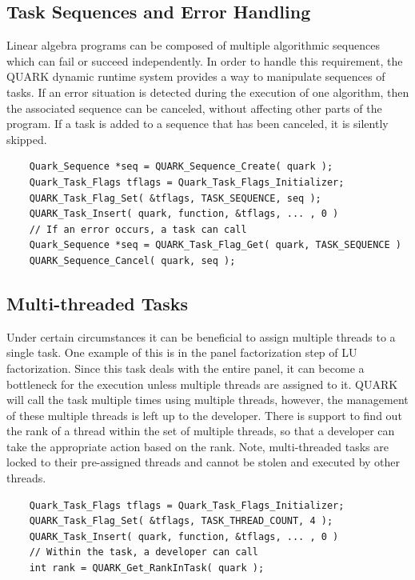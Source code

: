 \documentclass[11pt,letterpaper]{report}
\begin{document}
\subsection{Task Sequences and Error Handling}
Linear algebra programs can be composed of multiple algorithmic
sequences which can fail or succeed independently.  In order to handle
this requirement, the QUARK dynamic runtime system provides a way to
manipulate sequences of tasks.  If an error situation is detected
during the execution of one algorithm, then the associated sequence
can be canceled, without affecting other parts of the program.  If a task
is added to a sequence that has been canceled, it is silently
skipped.
\begin{samepage}
\begin{lstlisting}
    Quark_Sequence *seq = QUARK_Sequence_Create( quark );
    Quark_Task_Flags tflags = Quark_Task_Flags_Initializer;
    QUARK_Task_Flag_Set( &tflags, TASK_SEQUENCE, seq );
    QUARK_Task_Insert( quark, function, &tflags, ... , 0 )
    // If an error occurs, a task can call
    Quark_Sequence *seq = QUARK_Task_Flag_Get( quark, TASK_SEQUENCE )
    QUARK_Sequence_Cancel( quark, seq );
\end{lstlisting}
\end{samepage}

\subsection{Multi-threaded Tasks}
Under certain circumstances it can be beneficial to assign multiple
threads to a single task.  One example of this is in the panel
factorization step of LU factorization.  Since this task deals with
the entire panel, it can become a bottleneck for the execution unless
multiple threads are assigned to it.  QUARK will call the task
multiple times using multiple threads, however, the management of
these multiple threads is left up to the developer.  There is support
to find out the rank of a thread within the set of multiple threads,
so that a developer can take the appropriate action based on the rank.
Note, multi-threaded tasks are locked to their pre-assigned threads
and cannot be stolen and executed by other threads.
\begin{samepage}
\begin{lstlisting}
    Quark_Task_Flags tflags = Quark_Task_Flags_Initializer;
    QUARK_Task_Flag_Set( &tflags, TASK_THREAD_COUNT, 4 );
    QUARK_Task_Insert( quark, function, &tflags, ... , 0 )
    // Within the task, a developer can call
    int rank = QUARK_Get_RankInTask( quark );
\end{lstlisting}
\end{samepage}
\end{document}
